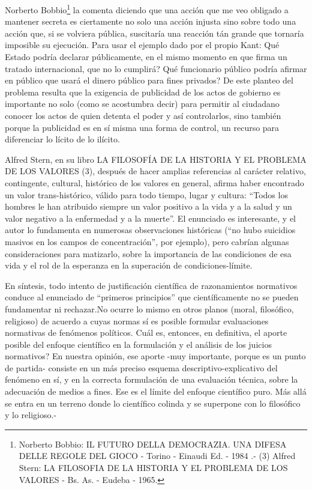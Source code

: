 \documentclass[
]{book}
\begin{document}
Norberto Bobbio\footnote{Norberto Bobbio: IL FUTURO DELLA DEMOCRAZIA. UNA DIFESA DELLE REGOLE DEL GIOCO - Torino - Einaudi Ed. - 1984 .- (3) Alfred Stern: LA FILOSOFIA DE LA HISTORIA Y EL PROBLEMA DE LOS VALORES - Bs. As. - Eudeba - 1965.} la comenta diciendo que una acción que me veo obligado a mantener secreta es ciertamente no solo una acción injusta sino sobre todo una acción que, si se volviera pública, suscitaría una reacción tán grande que tornaría imposible su ejecución. Para usar el ejemplo dado por el propio Kant: Qué Estado podría declarar públicamente, en el mismo momento en que firma un tratado internacional, que no lo cumplirá? Qué funcionario público podría afirmar en público que usará el dinero público para fines privados? De este planteo del problema resulta que la exigencia de publicidad de los actos de gobierno es importante no solo (como se acostumbra decir) para permitir al ciudadano conocer los actos de quien detenta el poder y así controlarlos, sino también porque la publicidad es en sí misma una forma de control, un recurso para diferenciar lo lícito de lo ilícito.

Alfred Stern, en su libro LA FILOSOFÍA DE LA HISTORIA Y EL PROBLEMA DE LOS VALORES (3), después de hacer amplias referencias al carácter relativo, contingente, cultural, histórico de los valores en general, afirma haber encontrado un valor trans-histórico, válido para todo tiempo, lugar y cultura: ``Todos los hombres le han atribuido siempre un valor positivo a la vida y a la salud y un valor negativo a la enfermedad y a la muerte''. El enunciado es interesante, y el autor lo fundamenta en numerosas observaciones históricas (``no hubo suicidios masivos en los campos de concentración'', por ejemplo), pero cabrían algunas consideraciones para matizarlo, sobre la importancia de las condiciones de esa vida y el rol de la esperanza en la superación de condiciones-límite.

En síntesis, todo intento de justificación científica de razonamientos normativos conduce al enunciado de ``primeros principios'' que científicamente no se pueden fundamentar ni rechazar.No ocurre lo mismo en otros planos (moral, filosófico, religioso) de acuerdo a cuyas normas sí es posible formular evaluaciones normativas de fenómenos políticos. Cuál es, entonces, en definitiva, el aporte posible del enfoque científico en la formulación y el análisis de los juicios normativos? En nuestra opinión, ese aporte -muy importante, porque es un punto de partida- consiste en un más preciso esquema descriptivo-explicativo del fenómeno en sí, y en la correcta formulación de una evaluación técnica, sobre la adecuación de medios a fines. Ese es el límite del enfoque científico puro. Más allá se entra en un terreno donde lo científico colinda y se superpone con lo filosófico y lo religioso.-
\end{document}

